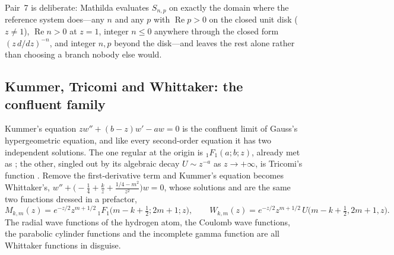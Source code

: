 Pair~7 is deliberate: Mathilda evaluates \(S_{n,p}\) on exactly the domain where the
reference system does---any \(n\) and any \(p\) with \(\operatorname{Re}p>0\) on the closed unit disk (\(z\ne1\)), \(\operatorname{Re}n>0\)
at \(z=1\), integer \(n\le0\) anywhere through the closed form \((z\,d/dz)^{-n}\), and
integer \(n,p\) beyond the disk---and leaves the rest alone rather than choosing a branch
nobody else would.

\subsection{Kummer, Tricomi and Whittaker: the confluent family}
\label{ssec:sf-whittaker}

Kummer's equation \(zw''+(b-z)w'-aw=0\) is the confluent limit of Gauss's
hypergeometric equation, and like every second-order equation it has two independent
solutions. The one regular at the origin is
\({}_1F_1(a;b;z)\), already met as ; the other, singled out
by its algebraic decay \(U\sim z^{-a}\) as \(z\to+\infty\), is Tricomi's function
. Remove the first-derivative term and Kummer's equation becomes
Whittaker's, \(w''+\bigl(-\tfrac14+\tfrac kz+\tfrac{1/4-m^2}{z^2}\bigr)w=0\), whose
solutions  and  are the same two functions dressed in a
prefactor,
\[
  M_{k,m}(z)=e^{-z/2}z^{m+1/2}\,{}_1F_1\bigl(m-k+\tfrac12;2m+1;z\bigr),\qquad
  W_{k,m}(z)=e^{-z/2}z^{m+1/2}\,U\bigl(m-k+\tfrac12,2m+1,z\bigr).
\]
The radial wave functions of the hydrogen atom, the Coulomb wave functions, the
parabolic cylinder functions and the incomplete gamma function are all Whittaker
functions in disguise.


